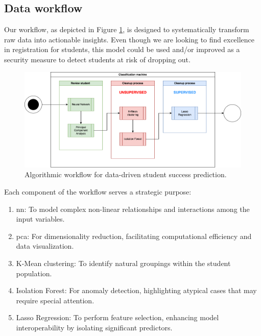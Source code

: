 \documentclass[../main.tex]{subfiles}
\begin{document}
\subsection{Data workflow}
\label{subsec:concimp_dataworkflow}
Our workflow, as depicted in Figure \ref{fig:dataworkflow}, is designed to systematically transform raw data into actionable insights. Even though we are looking to find excellence in registration for students, this model could be used and/or improved as a security measure to detect students at risk of dropping out.

\begin{figure}
    \centering
    \includegraphics[width=1\linewidth]{res//diagram/ML Workflow.png}
    \caption{Algorithmic workflow for data-driven student success prediction.}
    \label{fig:dataworkflow}
\end{figure}

Each component of the workflow serves a strategic purpose:

\begin{enumerate}
    \item \acrfull{nn}: To model complex non-linear relationships and interactions among the input variables.
    \item \acrfull{pca}: For dimensionality reduction, facilitating computational efficiency and data visualization.
    \item K-Mean clustering: To identify natural groupings within the student population.
    \item Isolation Forest: For anomaly detection, highlighting atypical cases that may require special attention.
    \item Lasso Regression: To perform feature selection, enhancing model interoperability by isolating significant predictors.
\end{enumerate}
\end{document}
